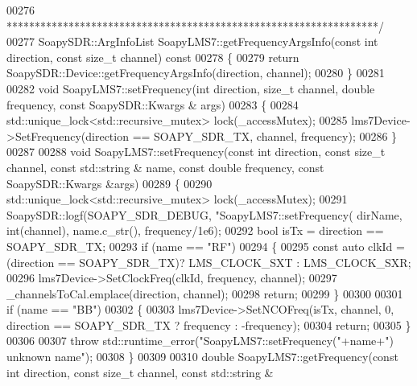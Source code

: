 \begin{DoxyCode}
{{{{{{{{{{00276 \textcolor{comment}{ ******************************************************************/}
00277 SoapySDR::ArgInfoList SoapyLMS7::getFrequencyArgsInfo(\textcolor{keyword}{const} \textcolor{keywordtype}{int} direction, \textcolor{keyword}{const} \textcolor{keywordtype}{size\_t} channel)\textcolor{keyword}{ const}
00278 \textcolor{keyword}{}\{
00279     \textcolor{keywordflow}{return} SoapySDR::Device::getFrequencyArgsInfo(direction, channel);
00280 \}
00281 
00282 \textcolor{keywordtype}{void} SoapyLMS7::setFrequency(\textcolor{keywordtype}{int} direction, \textcolor{keywordtype}{size\_t} channel, \textcolor{keywordtype}{double} frequency, \textcolor{keyword}{const} SoapySDR::Kwargs &
      args)
00283 \{
00284     std::unique\_lock<std::recursive\_mutex> lock(_accessMutex);
00285     lms7Device->SetFrequency(direction == SOAPY\_SDR\_TX, channel, frequency);
00286 \}
00287 
00288 \textcolor{keywordtype}{void} SoapyLMS7::setFrequency(\textcolor{keyword}{const} \textcolor{keywordtype}{int} direction, \textcolor{keyword}{const} \textcolor{keywordtype}{size\_t} channel, \textcolor{keyword}{const} std::string &
      name, \textcolor{keyword}{const} \textcolor{keywordtype}{double} frequency, \textcolor{keyword}{const} SoapySDR::Kwargs &args)
00289 \{
00290     std::unique\_lock<std::recursive\_mutex> lock(_accessMutex);
00291     SoapySDR::logf(SOAPY\_SDR\_DEBUG, \textcolor{stringliteral}{"SoapyLMS7::setFrequency(%
      dirName, \textcolor{keywordtype}{int}(channel), name.c\_str(), frequency/1e6);
00292     \textcolor{keywordtype}{bool} isTx = direction == SOAPY\_SDR\_TX;
00293     \textcolor{keywordflow}{if} (name == \textcolor{stringliteral}{"RF"})
00294     \{
00295         \textcolor{keyword}{const} \textcolor{keyword}{auto} clkId = (direction == SOAPY\_SDR\_TX)? LMS_CLOCK_SXT : 
      LMS_CLOCK_SXR;
00296         lms7Device->SetClockFreq(clkId, frequency, channel);
00297         _channelsToCal.emplace(direction, channel);
00298         \textcolor{keywordflow}{return};
00299     \}
00300 
00301     \textcolor{keywordflow}{if} (name == \textcolor{stringliteral}{"BB"})
00302     \{     
00303         lms7Device->SetNCOFreq(isTx, channel, 0, direction == SOAPY\_SDR\_TX ? frequency : -frequency);
00304         \textcolor{keywordflow}{return};
00305     \}
00306 
00307     \textcolor{keywordflow}{throw} std::runtime\_error(\textcolor{stringliteral}{"SoapyLMS7::setFrequency("}+name+\textcolor{stringliteral}{") unknown name"});
00308 \}
00309 
00310 \textcolor{keywordtype}{double} SoapyLMS7::getFrequency(\textcolor{keyword}{const} \textcolor{keywordtype}{int} direction, \textcolor{keyword}{const} \textcolor{keywordtype}{size\_t} channel, \textcolor{keyword}{const} std::string &
}}}}}}}}}}}
\end{DoxyCode}
